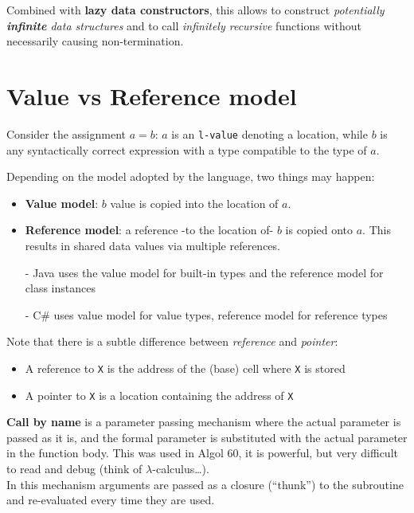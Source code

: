 Combined with \textbf{lazy data constructors}, this allows to
construct \textit{potentially \textbf{infinite} data structures} and to call
\textit{infinitely recursive} functions without necessarily causing non-termination.

\section{Value vs Reference model}
Consider the assignment $a = b$:
$a$ is an \texttt{l-value} denoting a location, while $b$ is any syntactically correct expression with a type compatible to the type of $a$.
{Depending on the model adopted by the language, two things may happen:\ns
\begin{itemize}
   \item \textbf{Value model}: $b$ value is copied into the location of $a$.
   \item \textbf{Reference model}: a reference -to the location of- $b$ is copied onto $a$. This results in shared data values via multiple references.
   \item[-] Java uses the value model for built-in types and the reference model for class instances
   \item[-] C\# uses value model for value types, reference model for reference types
\end{itemize}}

{Note that there is a subtle difference between \textit{reference} and \textit{pointer}:\ns
\begin{itemize}
	\item A reference to \texttt{X} is the address of the (base) cell where \texttt{X} is stored
	\item A pointer to \texttt{X} is a location containing the address of \texttt{X}
\end{itemize}}
\nl

\textbf{Call by name} is a parameter passing mechanism where the actual parameter is passed as it is, and the formal parameter is substituted with the actual parameter in the function body.
This was used in Algol 60, it is powerful, but very difficult to read and debug (think of $\lambda$-calculus\dots).\\
In this mechanism arguments are passed as a closure (``thunk'') to the subroutine and re-evaluated every time they are used.

